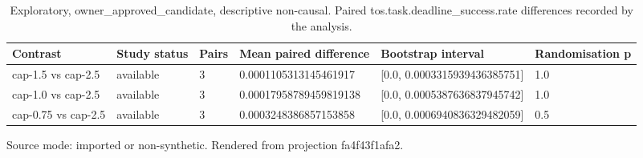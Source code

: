 {
\begin{table}[htbp]
\centering
\caption{Exploratory, owner\_approved\_candidate, descriptive non-causal. Paired tos.task.deadline\_success.rate differences recorded by the analysis.}
\label{tab:traffictwin-statistical-study-fa4f43f1afa2}
\small
\renewcommand{\arraystretch}{1.15}
\begin{tabular}{llllll}
\hline
Contrast & Study status & Pairs & Mean paired difference & Bootstrap interval & Randomisation p \\
\hline
cap-1.5 vs cap-2.5 & available & 3 & 0.0001105313145461917 & [0.0, 0.0003315939436385751] & 1.0 \\
cap-1.0 vs cap-2.5 & available & 3 & 0.00017958789459819138 & [0.0, 0.0005387636837945742] & 1.0 \\
cap-0.75 vs cap-2.5 & available & 3 & 0.0003248386857153858 & [0.0, 0.0006940836329482059] & 0.5 \\
\hline
\end{tabular}
\par\footnotesize
Source mode: imported or non-synthetic.
Rendered from projection fa4f43f1afa2.
\end{table}
}
